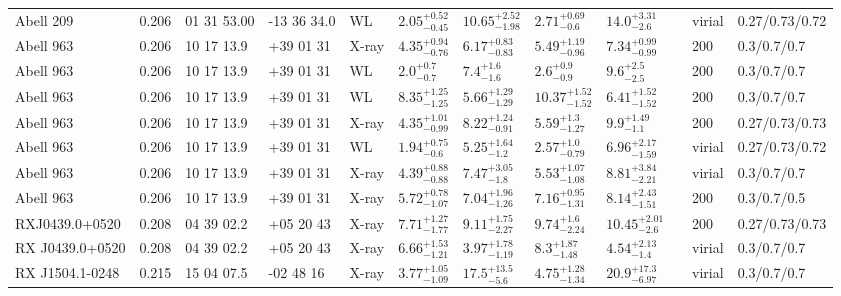 \begin{landscape}
\begin{center}
{\begin{longtable}{llllllllllll}
Abell 209 & 0.206 & 01 31 53.00 & -13 36 34.0 & WL & ${2.05}^{+0.52}_{-0.45}$ & ${10.65}^{+2.52}_{-1.98}$ & ${2.71}^{+0.69}_{-0.6}$ & ${14.0}^{+3.31}_{-2.6}$ & \citet{OK10.1} & virial & 0.27/0.73/0.72 \\
Abell 963 & 0.206 & 10 17 13.9 & +39 01 31 & X-ray & ${4.35}^{+0.94}_{-0.76}$ & ${6.17}^{+0.83}_{-0.83}$ & ${5.49}^{+1.19}_{-0.96}$ & ${7.34}^{+0.99}_{-0.99}$ & \citet{ET11.1} & 200 & 0.3/0.7/0.7 \\
Abell 963 & 0.206 & 10 17 13.9 & +39 01 31 & WL & ${2.0}^{+0.7}_{-0.7}$ & ${7.4}^{+1.6}_{-1.6}$ & ${2.6}^{+0.9}_{-0.9}$ & ${9.6}^{+2.5}_{-2.5}$ & \citet{SE14.1} & 200 & 0.3/0.7/0.7 \\
Abell 963 & 0.206 & 10 17 13.9 & +39 01 31 & WL & ${8.35}^{+1.25}_{-1.25}$ & ${5.66}^{+1.29}_{-1.29}$ & ${10.37}^{+1.52}_{-1.52}$ & ${6.41}^{+1.52}_{-1.52}$ & \citet{BA07.1} & 200 & 0.3/0.7/0.7 \\
Abell 963 & 0.206 & 10 17 13.9 & +39 01 31 & X-ray & ${4.35}^{+1.01}_{-0.99}$ & ${8.22}^{+1.24}_{-0.91}$ & ${5.59}^{+1.3}_{-1.27}$ & ${9.9}^{+1.49}_{-1.1}$ & \citet{BA14.1} & 200 & 0.27/0.73/0.73 \\
Abell 963 & 0.206 & 10 17 13.9 & +39 01 31 & WL & ${1.94}^{+0.75}_{-0.6}$ & ${5.25}^{+1.64}_{-1.2}$ & ${2.57}^{+1.0}_{-0.79}$ & ${6.96}^{+2.17}_{-1.59}$ & \citet{OK10.1} & virial & 0.27/0.73/0.72 \\
Abell 963 & 0.206 & 10 17 13.9 & +39 01 31 & X-ray & ${4.39}^{+0.88}_{-0.88}$ & ${7.47}^{+3.05}_{-1.8}$ & ${5.53}^{+1.07}_{-1.08}$ & ${8.81}^{+3.84}_{-2.21}$ & \citet{SC07.1} & virial & 0.3/0.7/0.7 \\
Abell 963 & 0.206 & 10 17 13.9 & +39 01 31 & X-ray & ${5.72}^{+0.78}_{-1.07}$ & ${7.04}^{+1.96}_{-1.26}$ & ${7.16}^{+0.95}_{-1.31}$ & ${8.14}^{+2.43}_{-1.51}$ & \citet{AL03.1} & 200 & 0.3/0.7/0.5 \\
RXJ0439.0+0520 & 0.208 & 04 39 02.2 & +05 20 43 & X-ray & ${7.71}^{+1.27}_{-1.77}$ & ${9.11}^{+1.75}_{-2.27}$ & ${9.74}^{+1.6}_{-2.24}$ & ${10.45}^{+2.01}_{-2.6}$ & \citet{BA14.1} & 200 & 0.27/0.73/0.73 \\
RX J0439.0+0520 & 0.208 & 04 39 02.2 & +05 20 43 & X-ray & ${6.66}^{+1.53}_{-1.21}$ & ${3.97}^{+1.78}_{-1.19}$ & ${8.3}^{+1.87}_{-1.48}$ & ${4.54}^{+2.13}_{-1.4}$ & \citet{SC07.1} & virial & 0.3/0.7/0.7 \\
RX J1504.1-0248 & 0.215 & 15 04 07.5 & -02 48 16 & X-ray & ${3.77}^{+1.05}_{-1.09}$ & ${17.5}^{+13.5}_{-5.6}$ & ${4.75}^{+1.28}_{-1.34}$ & ${20.9}^{+17.3}_{-6.97}$ & \citet{SC07.1} & virial & 0.3/0.7/0.7 \\

\end{longtable}}
\end{center}
\end{landscape}
